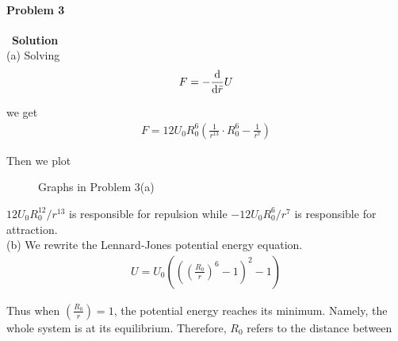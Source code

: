 \documentclass[12pt,a4paper]{article}
\begin{document}
\paragraph{\large \textbf{Problem 3}}~{\textbf{Solution}}
\vspace{2mm}\\
\noindent (a) Solving
\begin{align}
    F = -\frac{{\rm d}}{{\rm d}\bar{r}} U
\end{align}
\par we get 
\begin{align}
    F = 12U_0R_0^6\left( \frac{1}{r^{13}}\cdot R_0^6 - \frac{1}{r^7} \right)
\end{align}
\par Then we plot 
\begin{figure}[H]
    \centering
    \caption{Graphs in Problem 3(a)}
\end{figure}
\par $12U_0R_0^{12}/r^{13}$ is responsible for repulsion while $-12U_0R_0^6/r^7$ is responsible for 
attraction.\\
\noindent (b) We rewrite the Lennard-Jones potential energy equation.
\begin{align}
    U = U_0\left( \left( \left( \frac{R_0}{r} \right)^6 - 1 \right)^2 - 1 \right)
\end{align}
\par Thus when $\left( \frac{R_0}{r} \right) = 1$, the potential energy reaches its minimum.
Namely, the whole system is at its equilibrium. Therefore, $R_0$ refers to the distance between
\end{document}
